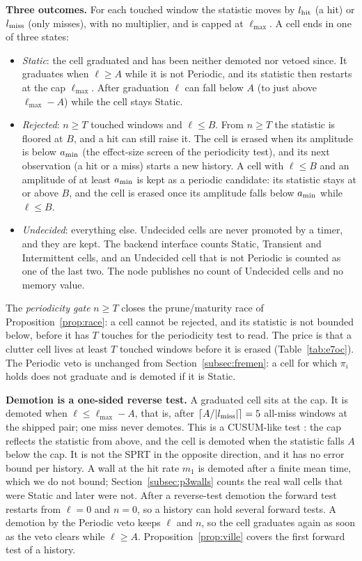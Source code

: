 \noindent\textbf{Three outcomes.} For each touched window the statistic moves by $l_{\mathrm{hit}}$ (a hit) or $l_{\mathrm{miss}}$ (only misses), with no multiplier, and is capped at $\ell_{\max}$. A cell ends in one of three states:
\begin{itemize}
  \item \emph{Static}: the cell graduated and has been neither demoted nor vetoed since. It graduates when $\ell\ge A$ while it is not Periodic, and its statistic then restarts at the cap $\ell_{\max}$. After graduation $\ell$ can fall below $A$ (to just above $\ell_{\max}-A$) while the cell stays Static.
  \item \emph{Rejected}: $n\ge T$ touched windows and $\ell\le B$. From $n\ge T$ the statistic is floored at $B$, and a hit can still raise it. The cell is erased when its amplitude is below $a_{\min}$ (the effect-size screen of the periodicity test), and its next observation (a hit or a miss) starts a new history. A cell with $\ell\le B$ and an amplitude of at least $a_{\min}$ is kept as a periodic candidate: its statistic stays at or above $B$, and the cell is erased once its amplitude falls below $a_{\min}$ while $\ell\le B$.
  \item \emph{Undecided}: everything else. Undecided cells are never promoted by a timer, and they are kept. The backend interface counts Static, Transient and Intermittent cells, and an Undecided cell that is not Periodic is counted as one of the last two. The node publishes no count of Undecided cells and no memory value.
\end{itemize}
The \emph{periodicity gate} $n\ge T$ closes the prune/maturity race of Proposition~\ref{prop:race}: a cell cannot be rejected, and its statistic is not bounded below, before it has $T$ touches for the periodicity test to read. The price is that a clutter cell lives at least $T$ touched windows before it is erased (Table~\ref{tab:e7oc}). The Periodic veto is unchanged from Section~\ref{subsec:fremen}: a cell for which $\pi_i$ holds does not graduate and is demoted if it is Static.

\noindent\textbf{Demotion is a one-sided reverse test.} A graduated cell sits at the cap. It is demoted when $\ell\le\ell_{\max}-A$, that is, after $\lceil A/|l_{\mathrm{miss}}|\rceil=5$ all-miss windows at the shipped pair; one miss never demotes. This is a CUSUM-like test \citep{page1954continuous}: the cap reflects the statistic from above, and the cell is demoted when the statistic falls $A$ below the cap. It is not the SPRT in the opposite direction, and it has no error bound per history. A wall at the hit rate $m_1$ is demoted after a finite mean time, which we do not bound; Section~\ref{subsec:p3walls} counts the real wall cells that were Static and later were not. After a reverse-test demotion the forward test restarts from $\ell=0$ and $n=0$, so a history can hold several forward tests. A demotion by the Periodic veto keeps $\ell$ and $n$, so the cell graduates again as soon as the veto clears while $\ell\ge A$. Proposition~\ref{prop:ville} covers the first forward test of a history.

